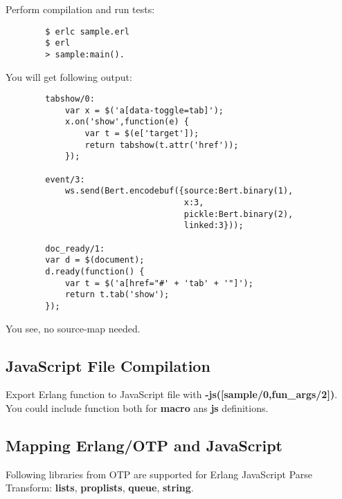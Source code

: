 \newpage
Perform compilation and run tests:

\vspace{1\baselineskip}
\begin{lstlisting}
        $ erlc sample.erl
        $ erl
        > sample:main().
\end{lstlisting}
\vspace{1\baselineskip}

You will get following output:

\vspace{1\baselineskip}
\begin{lstlisting}
        tabshow/0:
            var x = $('a[data-toggle=tab]');
            x.on('show',function(e) {
                var t = $(e['target']);
                return tabshow(t.attr('href'));
            });

        event/3:
            ws.send(Bert.encodebuf({source:Bert.binary(1),
                                    x:3,
                                    pickle:Bert.binary(2),
                                    linked:3}));

        doc_ready/1:
        var d = $(document);
        d.ready(function() {
            var t = $('a[href="#' + 'tab' + '"]');
            return t.tab('show');
        });
\end{lstlisting}
\vspace{1\baselineskip}

You see, no source-map needed.

\subsection{JavaScript File Compilation}
Export Erlang function to JavaScript file with {\bf -js([sample/0,fun\_{args}/2])}.
You could include function both for {\bf macro} ans {\bf js} definitions.

\subsection{Mapping Erlang/OTP and JavaScript}
Following libraries from OTP are supported for Erlang JavaScript Parse Transform: 
{\bf lists}, {\bf proplists}, {\bf queue}, {\bf string}.

